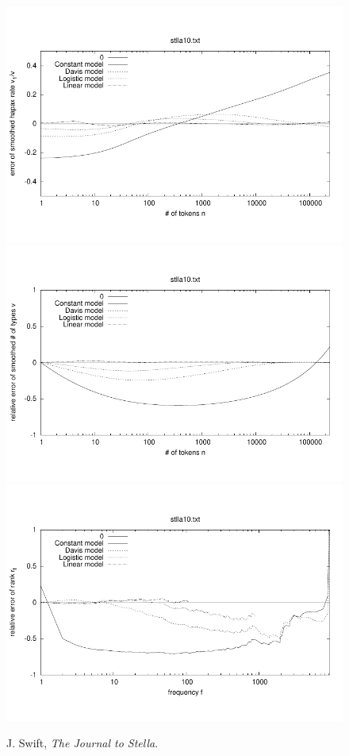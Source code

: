 \documentclass[a4paper,12pt]{article}
\begin{document}
\begin{figure}[p]
  \centering
  \vspace{-2em}
  \includegraphics[width=0.8\columnwidth]{output/herdan/stlla10_27/token_ratio_residual.pdf}
  \\[-3em]
  \includegraphics[width=0.8\columnwidth]{output/herdan/stlla10_27/token_residual.pdf}
  \\[-3em]
  \includegraphics[width=0.8\columnwidth]{output/herdan/stlla10_27/frequency_residual.pdf}
  \vspace{-2em}
  \caption{J. Swift, \emph{The Journal to Stella}.\label{figstlla10R}}
\end{figure}
\end{document}
